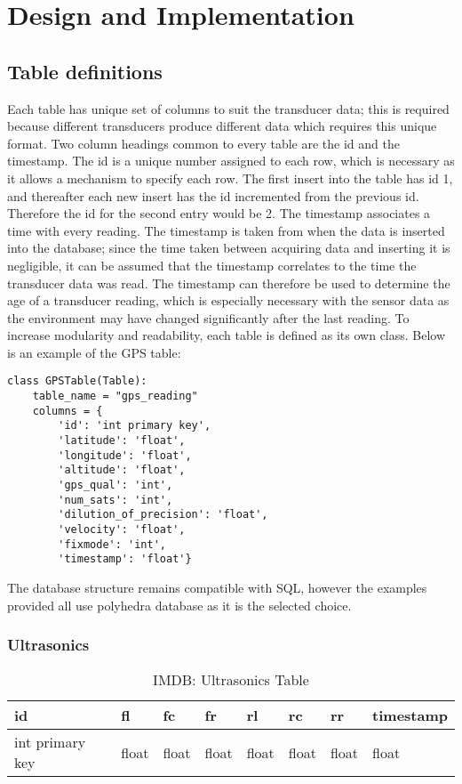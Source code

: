 \section{Design and Implementation}

\subsection{Table definitions}
Each table has unique set of columns to suit the transducer data; this is required because different transducers produce different data which requires this unique format. Two column headings common to every table are the id and the timestamp. 
\newline
The id is a unique number assigned to each row, which is necessary as it allows a mechanism to specify each row. The first insert into the table has id 1, and thereafter each new insert has the id incremented from the previous id. Therefore the id for the second entry would be 2.
\newline
The timestamp associates a time with every reading. The timestamp is taken from when the data is inserted into the database; since the time taken between acquiring data and inserting it is negligible, it can be assumed that the timestamp correlates to the time the transducer data was read. The timestamp can therefore be used to determine the age of a transducer reading, which is especially necessary with the sensor data as the environment may have changed significantly after the last reading.
\newline
To increase modularity and readability, each table is defined as its own class. Below is an example of the GPS table:
\newline
\begin{lstlisting}[style=custompython]
class GPSTable(Table):
    table_name = "gps_reading"
    columns = {
        'id': 'int primary key',
        'latitude': 'float',
        'longitude': 'float',
        'altitude': 'float',
        'gps_qual': 'int',
        'num_sats': 'int',
        'dilution_of_precision': 'float',
        'velocity': 'float',
        'fixmode': 'int',
        'timestamp': 'float'}
\end{lstlisting}
The database structure remains compatible with SQL, however the examples provided all use polyhedra database as it is the selected choice.

\subsubsection{Ultrasonics}
\begin{table}[!htb]
\centering
\begin{tabular}{|l|l|l|l|l|l|l|l|}
\hline
id              & fl    & fc    & fr    & rl    & rc    & rr    & timestamp \\ \hline
int primary key & float & float & float & float & float & float & float \\ \hline
\end{tabular}
\caption{IMDB: Ultrasonics Table}
\label{tab:db-ultrasonics}
\end{table}


